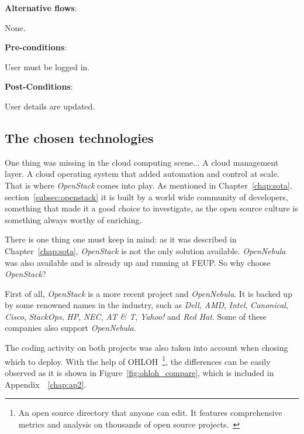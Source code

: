 \textbf{Alternative flows}:

None.

\textbf{Pre-conditions}:

User must be logged in.

\textbf{Post-Conditions}:

User details are updated.






\subsection{The chosen technologies}\label{subsec:tech}

One thing was missing in the cloud computing scene... A cloud management layer. A cloud operating system that added automation and control at scale. That is where \textit{OpenStack} comes into play. As mentioned in Chapter~\ref{chap:sota}, section~\ref{subsec:openstack} it is built by a world wide community of developers, something that made it a good choice to investigate, as the open source culture is something always worthy of enriching.~\cite{stackgithub}

There is one thing one must keep in mind: as it was described in Chapter~\ref{chap:sota}, \textit{OpenStack} is not the only solution available. \textit{OpenNebula} was also available and is already up and running at FEUP. So why choose \textit{OpenStack}?

First of all, \textit{OpenStack} is a more recent project and \textit{OpenNebula}. It is backed up by some renowned names in the industry, such as \textit{Dell}, \textit{AMD}, \textit{Intel}, \textit{Canonical}, \textit{Cisco}, \textit{StackOps}, \textit{HP}, \textit{NEC}, \textit{AT \& T}, \textit{Yahoo!} and \textit{Red Hat}. Some of these companies also support \textit{OpenNebula}.

The coding activity on both projects was also taken into account when chosing which to deploy. With the help of OHLOH~\footnote{An open source directory that anyone can edit. It features comprehensive metrics and analysis on thousands of open source projects.~\cite{ohloh}}, the differences can be easily observed as it is shown in Figure~\ref{fig:ohloh_compare}, which is included in Appendix~~\ref{chap:ap2}.

